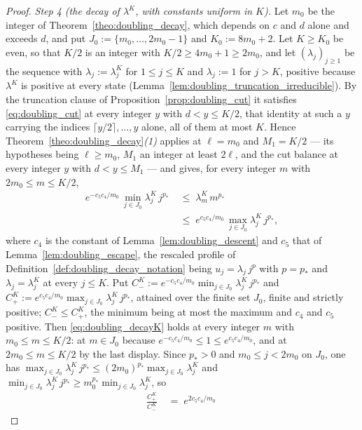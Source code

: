 \begin{proof}
\emph{Step 4 (the decay of $\lambda^K$, with constants uniform in $K$).} Let $m_0$ be the
integer of Theorem~\ref{theo:doubling_decay}, which depends on $c$ and $d$ alone and exceeds
$d$, and put $J_0:=\{m_0,\dots,2m_0-1\}$ and $K_0:=8m_0+2$. Let $K\geq K_0$ be even, so that
$K/2$ is an integer with $K/2\geq4m_0+1\geq2m_0$, and let $(\lambda_j)_{j\geq1}$ be the
sequence with $\lambda_j:=\lambda^K_j$ for $1\leq j\leq K$ and $\lambda_j:=1$ for $j>K$,
positive because $\lambda^K$ is positive at every state
(Lemma~\ref{lem:doubling_truncation_irreducible}). By the truncation clause of
Proposition~\ref{prop:doubling_cut} it satisfies \eqref{eq:doubling_cut} at every integer $y$
with $d<y\leq K/2$, that identity at such a $y$ carrying the indices
$\lceil y/2\rceil,\dots,y$ alone, all of them at most $K$. Hence
Theorem~\ref{theo:doubling_decay}\emph{(1)} applies at $\ell=m_0$ and $M_1=K/2$ --- its
hypotheses being $\ell\geq m_0$, $M_1$ an integer at least $2\ell$, and the cut balance at
every integer $y$ with $d<y\leq M_1$ --- and gives, for every integer $m$ with
$2m_0\leq m\leq K/2$,
\begin{equation}
\begin{aligned}
    e^{-c_5c_4/m_0}\,\min_{j\in J_0}\lambda^K_j\,j^{p_*}\;&\leq\;\lambda^K_m\,m^{p_*}\\
    \;&\leq\;e^{c_5c_4/m_0}\,\max_{j\in J_0}\lambda^K_j\,j^{p_*},
\end{aligned}
\end{equation}
where $c_4$ is the constant of Lemma~\ref{lem:doubling_descent} and $c_5$ that of
Lemma~\ref{lem:doubling_escape}, the rescaled profile of
Definition~\ref{def:doubling_decay_notation} being $u_j=\lambda_j\,j^{p}$ with $p=p_*$ and
$\lambda_j=\lambda^K_j$ at every $j\leq K$. Put
$C^K_-:=e^{-c_5c_4/m_0}\min_{j\in J_0}\lambda^K_j\,j^{p_*}$ and
$C^K_+:=e^{c_5c_4/m_0}\max_{j\in J_0}\lambda^K_j\,j^{p_*}$, attained over the finite set $J_0$,
finite and strictly positive; $C^K_-\leq C^K_+$, the minimum being at most the maximum and
$c_4$ and $c_5$ positive. Then \eqref{eq:doubling_decayK} holds at every integer $m$ with
$m_0\leq m\leq K/2$: at $m\in J_0$ because $e^{-c_5c_4/m_0}\leq1\leq e^{c_5c_4/m_0}$, and at
$2m_0\leq m\leq K/2$ by the last display. Since $p_*>0$ and $m_0\leq j<2m_0$ on $J_0$, one has
$\max_{j\in J_0}\lambda^K_j\,j^{p_*}\leq(2m_0)^{p_*}\max_{j\in J_0}\lambda^K_j$ and
$\min_{j\in J_0}\lambda^K_j\,j^{p_*}\geq m_0^{p_*}\min_{j\in J_0}\lambda^K_j$, so
\begin{equation}
\begin{aligned}
    \frac{C^K_+}{C^K_-}\;&=\;e^{2c_5c_4/m_0}\,

\end{aligned}
\end{equation}
\end{proof}
